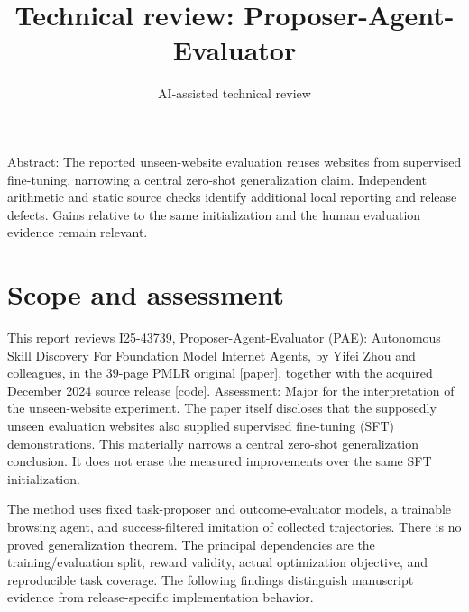 \documentclass[10pt]{article}
\title{Technical review: Proposer-Agent-Evaluator}
\author{AI-assisted technical review}
\date{}
\begin{document}
\maketitle
Abstract: The reported unseen-website evaluation reuses websites from supervised fine-tuning, narrowing a central zero-shot generalization claim. Independent arithmetic and static source checks identify additional local reporting and release defects. Gains relative to the same initialization and the human evaluation evidence remain relevant.\par
\section*{Scope and assessment}
This report reviews I25-43739, Proposer-Agent-Evaluator (PAE): Autonomous Skill Discovery For Foundation Model Internet Agents, by Yifei Zhou and colleagues, in the 39-page PMLR original [paper], together with the acquired December 2024 source release [code]. Assessment: Major for the interpretation of the unseen-website experiment. The paper itself discloses that the supposedly unseen evaluation websites also supplied supervised fine-tuning (SFT) demonstrations. This materially narrows a central zero-shot generalization conclusion. It does not erase the measured improvements over the same SFT initialization.\par
The method uses fixed task-proposer and outcome-evaluator models, a trainable browsing agent, and success-filtered imitation of collected trajectories. There is no proved generalization theorem. The principal dependencies are the training/evaluation split, reward validity, actual optimization objective, and reproducible task coverage. The following findings distinguish manuscript evidence from release-specific implementation behavior.\par
\end{document}
